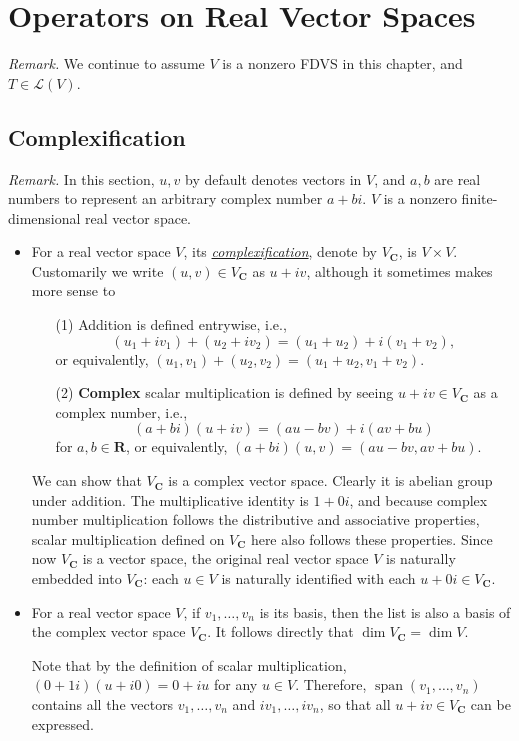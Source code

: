 \documentclass[11pt]{article}
\newcommand{\df}[1]{\ul{\textit{\textsf{#1}}}}
\newcommand{\R}{\mathbf{R}}
\newcommand{\C}{\mathbf{C}}
\newcommand{\s}{\operatorname{span}}
\renewcommand{\d}{\dim}
\newcommand{\LV}{\mathcal{L}(V)}
\begin{document}
\newpage
\section{Operators on Real Vector Spaces}
\textit{Remark.} We continue to assume $V$ is a nonzero FDVS in this chapter, and $T \in \LV$.
\subsection{Complexification}
\textit{Remark.} In this section, $u,v$ by default denotes vectors in $V$, and $a,b$ are real numbers to represent an arbitrary complex number $a+bi$. $V$ is a nonzero finite-dimensional real vector space.
\begin{itemize}
    \item For a real vector space $V$, its \df{complexification}, denote by $V_\C$, is $V \times V$. Customarily we write $(u,v) \in V_\C$ as $u + iv$, although it sometimes makes more sense to \emph{}
    \begin{enumerate}
        \item [(1)] Addition is defined entrywise, i.e., \[(u_1+iv_1)+(u_2+iv_2)=(u_1+u_2)+i(v_1+v_2),\] or equivalently, $(u_1,v_1)+(u_2,v_2) = (u_1+u_2,v_1+v_2)$.
        \item [(2)] \textbf{Complex} scalar multiplication is defined by seeing $u+iv \in V_\C$ as a complex number, i.e., \[(a+bi)(u+iv) = (au-bv)+i(av+bu)\] for $a,b \in \R$, or equivalently, $(a+bi)(u,v) = (au-bv,av+bu)$.
    \end{enumerate}

    We can show that $V_\C$ is a complex vector space. Clearly it is abelian group under addition. The multiplicative identity is $1+0i$, and because complex number multiplication follows the distributive and associative properties, scalar multiplication defined on $V_\C$ here also follows these properties. Since now $V_\C$ is a vector space, the original real vector space $V$ is naturally embedded into $V_\C$: each $u \in V$ is naturally identified with each $u+0i \in V_\C$.
    \item For a real vector space $V$, if $v_1,\dots,v_n$ is its basis, then the list is also a basis of the complex vector space $V_\C$. It follows directly that $\d V_\C = \d V$.

    Note that by the definition of scalar multiplication, $(0+1i)(u+i0) = 0+iu$ for any $u \in V$. Therefore, $\s(v_1,\dots,v_n)$ contains all the vectors $v_1,\dots,v_n$ and $iv_1,\dots,iv_n$, so that all $u+iv \in V_\C$ can be expressed.
    

\end{itemize}
\end{document}
